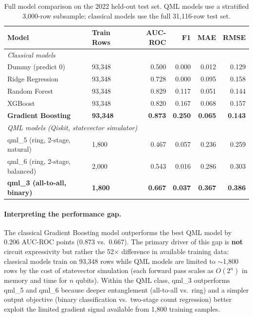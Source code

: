\documentclass[11pt,a4paper]{article}
\begin{document}
\begin{table}[H]
\centering
\caption{Full model comparison on the 2022 held-out test set. QML models use
         a stratified 3,000-row subsample; classical models use the full 31,116-row test set.}
\begin{tabular}{llrrrr}
\toprule
\textbf{Model} & \textbf{Train Rows} & \textbf{AUC-ROC} & \textbf{F1} & \textbf{MAE} & \textbf{RMSE} \\
\midrule
\multicolumn{6}{l}{\textit{Classical models}} \\
Dummy (predict 0) & 93,348 & 0.500 & 0.000 & 0.012 & 0.129 \\
Ridge Regression  & 93,348 & 0.728 & 0.000 & 0.095 & 0.158 \\
Random Forest     & 93,348 & 0.829 & 0.117 & 0.051 & 0.144 \\
XGBoost           & 93,348 & 0.820 & 0.167 & 0.068 & 0.157 \\
\textbf{Gradient Boosting} & \textbf{93,348} & \textbf{0.873} & \textbf{0.250} & \textbf{0.065} & \textbf{0.143} \\
\midrule
\multicolumn{6}{l}{\textit{QML models (Qiskit, statevector simulator)}} \\
qml\_5 (ring, 2-stage, natural) & 1,800 & 0.467 & 0.057 & 0.236 & 0.259 \\
qml\_6 (ring, 2-stage, balanced) & 2,000 & 0.543 & 0.016 & 0.286 & 0.303 \\
\textbf{qml\_3 (all-to-all, binary)} & \textbf{1,800} & \textbf{0.667} & \textbf{0.037} & \textbf{0.367} & \textbf{0.386} \\
\bottomrule
\end{tabular}
\label{tab:full_comparison}
\end{table}

\paragraph{Interpreting the performance gap.}
The classical Gradient Boosting model outperforms the best QML model by
0.206 AUC-ROC points (0.873 vs.\ 0.667). The primary driver of this gap is
\textbf{not} circuit expressivity but rather the 52$\times$ difference in
available training data: classical models train on 93,348 rows while QML
models are limited to $\sim$1,800 rows by the cost of statevector simulation
(each forward pass scales as $O(2^n)$ in memory and time for $n$ qubits).
Within the QML class, qml\_3 outperforms qml\_5 and qml\_6 because deeper
entanglement (all-to-all vs.\ ring) and a simpler output objective (binary
classification vs.\ two-stage count regression) better exploit the limited
gradient signal available from 1,800 training samples.
\end{document}
